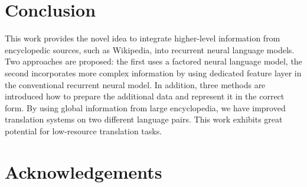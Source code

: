 \documentclass[a4paper]{article}
\begin{document}
\section{Conclusion}
This work provides the novel idea to integrate higher-level information from encyclopedic sources, such as Wikipedia, into recurrent neural language models. Two approaches are proposed: the first uses a factored neural language model, the second incorporates more complex information by using dedicated feature layer in the conventional recurrent neural model. In addition, three methods are introduced how to prepare the additional data and represent it in the correct form.
By using global information from large encyclopedia, we have improved translation systems on two different language pairs.  
This work exhibits great potential for low-resource translation tasks. 



\section{Acknowledgements}
\end{document}
